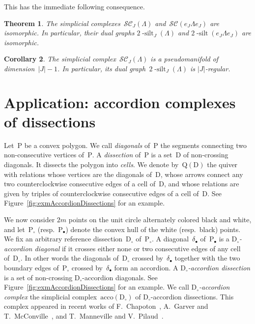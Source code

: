 \documentclass{amsart}
\newtheorem{theorem}{Theorem}%
\newtheorem{corollary}[theorem]{Corollary}
\theoremstyle{definition}
\newcommand{\fref}[1]{Figure~\ref{#1}} %
\newcommand{\darkblue}{\color{darkblue}} %
\newcommand{\defn}[1]{\textsl{\darkblue #1}} %
\newcommand{\accordionComplex}{\mathrm{acco}} %
\newcommand{\polygon}{\mathrm{P}} %
\newcommand{\dissection}{\mathrm{D}} %
\newcommand{\quiver}{\mathrm{Q}} %
\newcommand{\silt}{2 \! \operatorname{-silt}}
\newcommand{\siltingComplex}{\mathcal{SC}}
\begin{document}
This has the immediate following consequence.

\begin{theorem}
The simplicial complexes~$\siltingComplex_J(\Lambda)$ and~$\siltingComplex(e_J \Lambda e_J)$ are isomorphic.
In particular, their dual graphs $\silt_J(\Lambda)$ and $\silt(e_J \Lambda e_J)$ are isomorphic.
\end{theorem}

\begin{corollary}
The simplicial complex~$\siltingComplex_J(\Lambda)$ is a pseudomanifold of dimension~$|J|-1$. In particular, its dual graph~$\silt_J(\Lambda)$ is $|J|$-regular.
\end{corollary}


\section{Application: accordion complexes of dissections}
\label{sec:accordions}

Let~$\polygon$ be a convex polygon.
We call \defn{diagonals} of~$\polygon$ the segments connecting two non-consecutive vertices of~$\polygon$.
A \defn{dissection} of~$\polygon$ is a set~$\dissection$ of non-crossing diagonals.
It dissects the polygon into \defn{cells}.
We denote by~$\quiver(\dissection)$ the quiver with relations whose vertices are the diagonals of~$\dissection$, whose arrows connect any two counterclockwise consecutive edges of a cell of~$\dissection$, and whose relations are given by triples of counterclockwise consecutive edges of a cell of~$\dissection$.
See \fref{fig:exmAccordionDissections} for an example.

We now consider $2m$ points on the unit circle alternately colored black and white, and let~$\polygon_\circ$ (resp.~$\polygon_\bullet$) denote the convex hull of the white (resp.~black) points.
We fix an arbitrary reference dissection~$\dissection_\circ$ of~$\polygon_\circ$.
A diagonal~$\delta_\bullet$ of~$\polygon_\bullet$ is a \defn{$\dissection_\circ$-accordion diagonal} if it crosses either none or two consecutive edges of any cell of~$\dissection_\circ$.
In other words the diagonals of~$\dissection_\circ$ crossed by~$\delta_\bullet$ together with the two boundary edges of~$\polygon_\circ$ crossed by~$\delta_\bullet$ form an accordion.
A \defn{$\dissection_\circ$-accordion dissection} is a set of non-crossing \mbox{$\dissection_\circ$-accordion} diagonals. 
See \fref{fig:exmAccordionDissections} for an example.
We call \defn{$\dissection_\circ$-accordion complex} the simplicial complex~$\accordionComplex(\dissection_\circ)$ of $\dissection_\circ$-accordion dissections.
This complex appeared in recent works of F.~Chapoton~\cite{Chapoton-quadrangulations}, A.~Garver and T.~McConville~\cite{GarverMcConville}, and T.~Manneville and V.~Pilaud~\cite{MannevillePilaud-accordion}.
\end{document}

